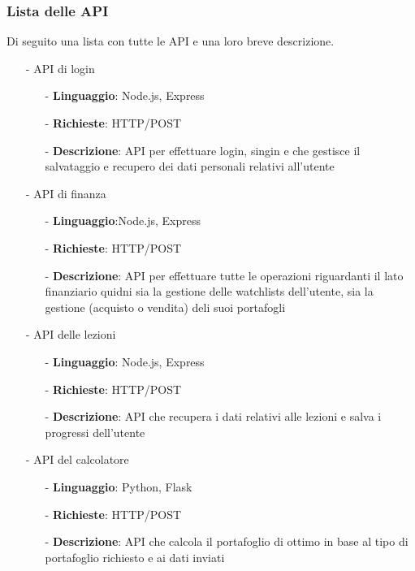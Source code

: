 \subsubsection{Lista delle API}
Di seguito una lista con tutte le API e una loro breve descrizione.

\begin{enumerate}

\item[-] API di login    \begin{enumerate}
                            \item[-] \textbf{Linguaggio}: Node.js, Express
                            \item[-] \textbf{Richieste}: HTTP/POST
                            \item[-] \textbf{Descrizione}: API per effettuare login, singin e che gestisce il salvataggio e recupero dei dati personali relativi all'utente
                        \end{enumerate}
\item[-] API di finanza \begin{enumerate}
                            \item[-] \textbf{Linguaggio}:Node.js, Express
                            \item[-] \textbf{Richieste}: HTTP/POST
                            \item[-] \textbf{Descrizione}: API per effettuare tutte le operazioni riguardanti il lato finanziario quidni sia la gestione delle watchlists dell'utente, sia la gestione (acquisto o vendita) deli suoi portafogli
                        \end{enumerate}
\item[-] API delle lezioni \begin{enumerate}
                            \item[-] \textbf{Linguaggio}: Node.js, Express
                            \item[-] \textbf{Richieste}: HTTP/POST
                            \item[-] \textbf{Descrizione}: API che recupera i dati relativi alle lezioni e salva i progressi dell'utente
                        \end{enumerate}
\item[-] API del calcolatore \begin{enumerate}
                            \item[-] \textbf{Linguaggio}: Python, Flask
                            \item[-] \textbf{Richieste}: HTTP/POST
                            \item[-] \textbf{Descrizione}: API che calcola il portafoglio di ottimo in base al tipo di portafoglio richiesto e ai dati inviati
                        \end{enumerate}

\end{enumerate}


